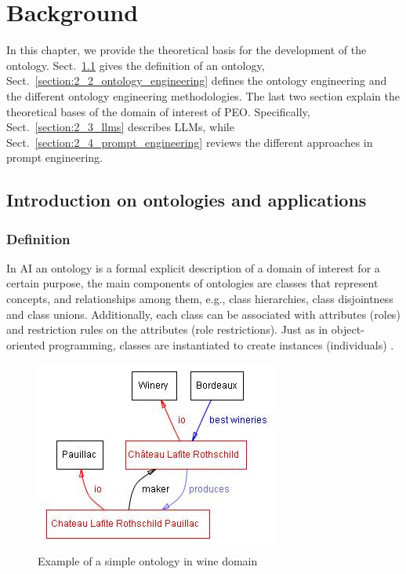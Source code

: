 \chapter{Background}
\label{chapter:background}

In this chapter, we provide the theoretical basis for the development of the ontology.
Sect.~\ref{section:2_1_ontologies} gives the definition of an ontology, Sect.~\ref{section:2_2_ontology_engineering} defines the ontology engineering and the different ontology engineering methodologies.
The last two section explain the theoretical bases of the domain of interest of PEO.
Specifically, Sect.~\ref{section:2_3_llms} describes LLMs, while Sect.~\ref{section:2_4_prompt_engineering} reviews the different approaches in prompt engineering.

\section{Introduction on ontologies and applications}\label{section:2_1_ontologies}
\subsection{Definition}
In AI an ontology is a formal explicit description of a domain of interest for a certain purpose, the main components of ontologies are classes that represent concepts, and relationships among them, e.g., class hierarchies, class disjointness and class unions.
Additionally, each class can be associated with attributes (roles) and restriction rules on the attributes (role restrictions).
Just as in object-oriented programming, classes are instantiated to create instances (individuals) \cite{protege_ontology}.

\begin{figure}[H]
    \centering
    \includegraphics[width=0.5\linewidth]{Figures/fig_0.jpg}
    \caption{Example of a simple ontology in wine domain}
    \label{fig:wine_ontology}
\end{figure}

